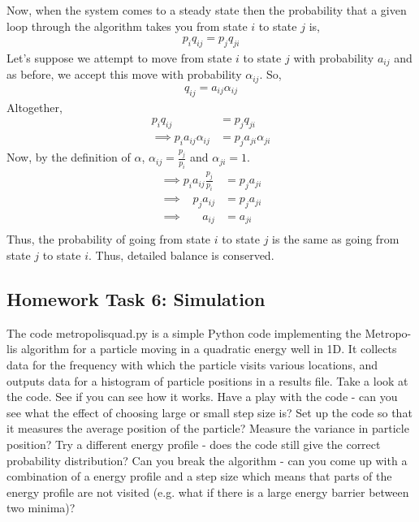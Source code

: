 \documentclass[12pt]{article}
\begin{document}
Now, when the system comes to a steady state then the probability that a given loop through the algorithm takes you from state $i$ to state $j$ is,
\begin{align} 
p_{i}q_{i j} = p_{j}q_{ji}
\end{align}
Let's suppose we attempt to move from state $i$ to state $j$ with probability $a_{i j}$ and as before, we accept this move with probability $\alpha_{i j}$. So, 
\begin{align} 
q_{ij} = a_{ij}\alpha_{ij}
\end{align}
Altogether, 
\begin{align} 
p_{i}q_{i j} &= p_{j}q_{ji} \\
\implies p_{i}a_{i j}\alpha_{i j} &= p_{j}a_{j i}\alpha_{j i}
\end{align}
Now, by the definition of $\alpha$, $\alpha_{i j} = \frac{p_{j}}{p_{i}}$ and $\alpha_{j i} = 1$.
\begin{align} 
\implies p_{i}a_{i j} \frac{p_{j}}{p_{i}} &= p_{j}a_{j i} \\
\implies \; \; \; p_{j}a_{i j} &= p_{j}a_{j i} \\
\implies \; \; \; \; \; \; a_{i j} &= a_{j i} \\
\end{align}
Thus, the probability of going from state $i$ to state $j$ is the same as going from state $j$ to state $i$. Thus, detailed balance is conserved. 

\subsection*{Homework Task 6: Simulation}

The code metropolisquad.py is a simple Python code implementing the Metropo- lis algorithm for a particle moving in a quadratic energy well in 1D. It collects data for the frequency with which the particle visits various locations, and outputs data for a histogram of particle positions in a results file. Take a look at the code. See if you can see how it works. Have a play with the code - can you see what the effect of choosing large or small step size is? Set up the code so that it measures the average position of the particle? Measure the variance in particle position? Try a different energy profile - does the code still give the correct probability distribution? Can you break the algorithm - can you come up with a combination of a energy profile and a step size which means that parts of the energy profile are not visited (e.g. what if there is a large energy barrier between two minima)?
\end{document}
